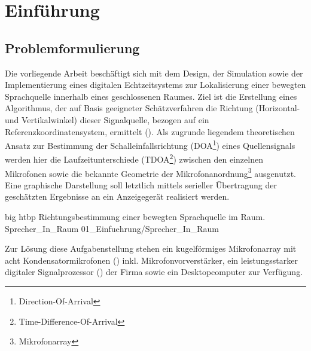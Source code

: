 
\chapter{Einführung}
\label{chap:Einfuehrung}




\section{Problemformulierung}
\label{sec:Problemformulierung}
Die vorliegende Arbeit beschäftigt sich mit dem Design, der Simulation sowie der Implementierung eines digitalen Echtzeitsystems zur Lokalisierung einer bewegten Sprachquelle innerhalb eines geschlossenen Raumes. Ziel ist die Erstellung eines Algorithmus, der auf Basis geeigneter Schätzverfahren die Richtung (Horizontal- und Vertikalwinkel) dieser Signalquelle, bezogen auf ein Referenzkoordinatensystem, ermittelt (). Als zugrunde liegendem theoretischen Ansatz zur Bestimmung der Schalleinfallsrichtung (DOA\footnote{Direction-Of-Arrival}) eines Quellensignals werden hier die Laufzeitunterschiede (TDOA\footnote{Time-Difference-Of-Arrival}) zwischen den einzelnen Mikrofonen sowie die bekannte Geometrie der Mikrofonanordnung\footnote{Mikrofonarray} ausgenutzt. Eine graphische Darstellung soll letztlich mittels serieller Übertragung der geschätzten Ergebnisse an ein Anzeigegerät realisiert werden.

         {big}
         {htbp}
         {Richtungsbestimmung einer bewegten Sprachquelle im Raum.}
         {Sprecher_In_Raum} 
         {01_Einfuehrung/Sprecher_In_Raum}

Zur Lösung diese Aufgabenstellung stehen ein kugelförmiges Mikrofonarray mit acht Kondensatormikrofonen () inkl. Mikrofonvorverstärker, ein leistungsstarker digitaler Signalprozessor () der Firma \ti sowie ein Desktopcomputer zur Verfügung.

